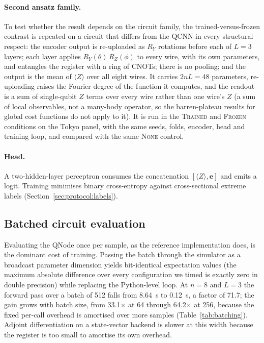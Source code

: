 \paragraph{Second ansatz family.}
To test whether the result depends on the circuit family, the
trained-versus-frozen contrast is repeated on a circuit that differs from the
QCNN in every structural respect: the encoder output is
re-uploaded as $R_Y$ rotations before each of $L = 3$ layers; each layer
applies $R_Y(\theta)\,R_Z(\phi)$ to every wire, with its own parameters, and
entangles the register with a ring of CNOTs; there is no pooling; and the
output is the mean of $\langle Z \rangle$ over all eight wires. It carries
$2nL = 48$ parameters, re-uploading raises the Fourier degree of the function
it computes, and the readout is a sum of single-qubit $Z$ terms over every
wire rather than one wire's $Z$ (a sum of local observables, not a many-body
operator, so the barren-plateau results for global cost functions do not apply
to it). It is run in the
\textsc{Trained} and \textsc{Frozen} conditions on the Tokyo panel, with the
same seeds, folds, encoder, head and training loop, and compared with the
same \textsc{None} control.

\paragraph{Head.}
A two-hidden-layer perceptron consumes the concatenation
$[\langle Z \rangle, \mathbf{e}]$ and emits a logit. Training minimises binary
cross-entropy against cross-sectional extreme labels
(Section~\ref{sec:protocol:labels}).

\subsection{Batched circuit evaluation}
\label{sec:method:batched}
Evaluating the QNode once per sample, as the reference implementation does, is
the dominant cost of training. Passing the batch through the simulator as a
broadcast parameter dimension yields bit-identical expectation values (the
maximum absolute difference over every configuration we timed is exactly zero
in double precision) while replacing the Python-level loop. At $n=8$ and
$L=3$ the forward pass over a batch of \num{512} falls from
\SI{8.64}{\second} to \SI{0.12}{\second}, a factor of \num{71.7}; the gain
grows with batch size, from \num{33.1}$\times$ at \num{64} through
\num{64.2}$\times$ at \num{256}, because the fixed per-call overhead is
amortised over more samples (Table~\ref{tab:batching}). Adjoint differentiation
on a state-vector backend is slower at this width because the register is too
small to amortise its own overhead.

